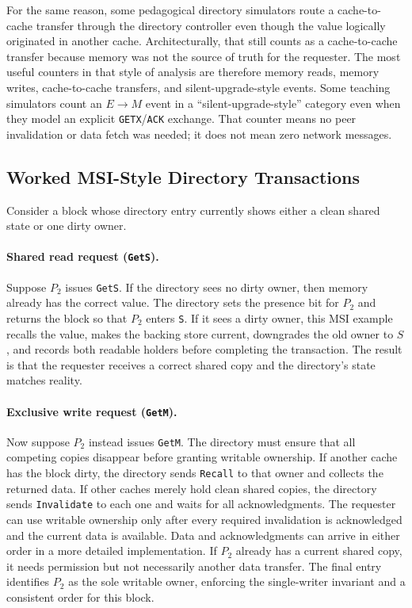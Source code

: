 For the same reason, some pedagogical directory simulators route a cache-to-cache transfer through the directory controller even though the value logically originated in another cache.
Architecturally, that still counts as a cache-to-cache transfer because memory was not the source of truth for the requester.
The most useful counters in that style of analysis are therefore memory reads, memory writes, cache-to-cache transfers, and silent-upgrade-style events.
Some teaching simulators count an $E\rightarrow M$ event in a ``silent-upgrade-style'' category even when they model an explicit \texttt{GETX}/\texttt{ACK} exchange.
That counter means no peer invalidation or data fetch was needed; it does not mean zero network messages.

\subsection*{Worked MSI-Style Directory Transactions}
Consider a block whose directory entry currently shows either a clean shared state or one dirty owner.

\paragraph{Shared read request (\texttt{GetS}).}
Suppose $P_2$ issues \texttt{GetS}.
If the directory sees no dirty owner, then memory already has the correct value.
The directory sets the presence bit for $P_2$ and returns the block so that $P_2$ enters \texttt{S}.
If it sees a dirty owner, this MSI example recalls the value, makes the backing store current, downgrades the old owner to $S$, and records both readable holders before completing the transaction.
The result is that the requester receives a correct shared copy and the directory's state matches reality.

\paragraph{Exclusive write request (\texttt{GetM}).}
Now suppose $P_2$ instead issues \texttt{GetM}.
The directory must ensure that all competing copies disappear before granting writable ownership.
If another cache has the block dirty, the directory sends \texttt{Recall} to that owner and collects the returned data.
If other caches merely hold clean shared copies, the directory sends \texttt{Invalidate} to each one and waits for all acknowledgments.
The requester can use writable ownership only after every required invalidation is acknowledged and the current data is available.
Data and acknowledgments can arrive in either order in a more detailed implementation.
If $P_2$ already has a current shared copy, it needs permission but not necessarily another data transfer.
The final entry identifies $P_2$ as the sole writable owner, enforcing the single-writer invariant and a consistent order for this block.

